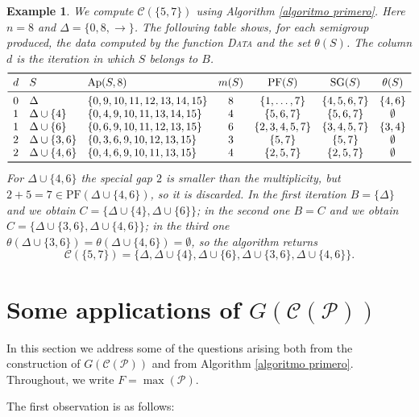 \documentclass[11pt]{article}
\newtheorem{example}[theorem]{Example}
\numberwithin{equation}{section}
\newcommand{\Ap}{\mathrm{Ap}}
\newcommand{\PF}{\mathrm{PF}}
\newcommand{\SG}{\mathrm{SG}}
\begin{document}
\begin{example}\label{ejemplo segundo}
    We compute $\mathcal C(\{5,7\})$ using Algorithm \ref{algoritmo primero}. Here $n=8$ and $\Delta=\{0,8,\rightarrow\}$. The following table shows, for each semigroup produced, the data computed by the function \textup{\textsc{Data}} and the set $\theta(S)$. The column $d$ is the iteration in which $S$ belongs to $B$.
    \[
    \begin{array}{cllcccc}
    \toprule
    d & S & \Ap(S,8) & m(S) & \PF(S) & \SG(S) & \theta(S)\\
    \midrule
    0 & \Delta & \{0,9,10,11,12,13,14,15\} & 8 & \{1,\ldots,7\} & \{4,5,6,7\} & \{4,6\}\\
    1 & \Delta\cup\{4\} & \{0,4,9,10,11,13,14,15\} & 4 & \{5,6,7\} & \{5,6,7\} & \emptyset\\
    1 & \Delta\cup\{6\} & \{0,6,9,10,11,12,13,15\} & 6 & \{2,3,4,5,7\} & \{3,4,5,7\} & \{3,4\}\\
    2 & \Delta\cup\{3,6\} & \{0,3,6,9,10,12,13,15\} & 3 & \{5,7\} & \{5,7\} & \emptyset\\
    2 & \Delta\cup\{4,6\} & \{0,4,6,9,10,11,13,15\} & 4 & \{2,5,7\} & \{2,5,7\} & \emptyset\\
    \bottomrule
    \end{array}
    \]
    For $\Delta\cup\{4,6\}$ the special gap $2$ is smaller than the multiplicity, but $2+5=7\in\PF(\Delta\cup\{4,6\})$, so it is discarded. In the first iteration $B=\{\Delta\}$ and we obtain $C=\{\Delta\cup\{4\},\Delta\cup\{6\}\}$; in the second one $B=C$ and we obtain $C=\{\Delta\cup\{3,6\},\Delta\cup\{4,6\}\}$; in the third one $\theta(\Delta\cup\{3,6\})=\theta(\Delta\cup\{4,6\})=\emptyset$, so the algorithm returns
    \[
    \mathcal C(\{5,7\})=\{\Delta,\Delta\cup\{4\},\Delta\cup\{6\},\Delta\cup\{3,6\},\Delta\cup\{4,6\}\}.
    \]
\end{example}

\section{\texorpdfstring{Some applications of $G(\mathcal{C}(\mathcal{P}))$}{Some applications of G(C(P))}}\label{sec:applications}

In this section we address some of the questions arising both from the construction of $G(\mathcal{C}(\mathcal{P}))$ and from Algorithm \ref{algoritmo primero}. Throughout, we write $F=\max(\mathcal P)$.

The first observation is as follows:
\end{document}
